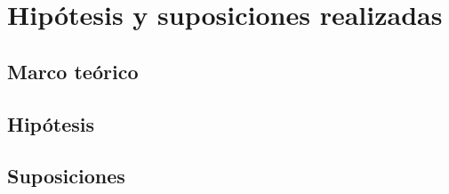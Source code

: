 \section{Hipótesis y suposiciones realizadas}
\subsection{Marco teórico}
\subsection{Hipótesis}
\subsection{Suposiciones}